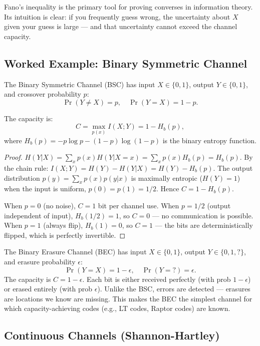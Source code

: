 Fano's inequality is the primary tool for proving converses in information theory. Its intuition is clear: if you frequently guess wrong, the uncertainty about $X$ given your guess is large — and that uncertainty cannot exceed the channel capacity.

\subsection{Worked Example: Binary Symmetric Channel}
\label{sec:information:bsc}

\begin{example}
The Binary Symmetric Channel (BSC) has input $X \in \{0,1\}$, output $Y \in \{0,1\}$, and crossover probability $p$:
\[
\Pr(Y \neq X) = p, \quad \Pr(Y = X) = 1-p.
\]

The capacity is:
\[
C = \max_{p(x)} I(X;Y) = 1 - H_b(p),
\]
where $H_b(p) = -p\log p - (1-p)\log(1-p)$ is the binary entropy function.

\begin{proof}
$H(Y|X) = \sum_x p(x)H(Y|X=x) = \sum_x p(x) H_b(p) = H_b(p)$. By the chain rule: $I(X;Y) = H(Y) - H(Y|X) = H(Y) - H_b(p)$. The output distribution $p(y) = \sum_x p(x)p(y|x)$ is maximally entropic ($H(Y)=1$) when the input is uniform, $p(0)=p(1)=1/2$. Hence $C = 1 - H_b(p)$.

When $p=0$ (no noise), $C=1$ bit per channel use. When $p=1/2$ (output independent of input), $H_b(1/2)=1$, so $C=0$ — no communication is possible. When $p=1$ (always flip), $H_b(1)=0$, so $C=1$ — the bits are deterministically flipped, which is perfectly invertible.
\end{proof}
\end{example}

\begin{example}
The Binary Erasure Channel (BEC) has input $X \in \{0,1\}$, output $Y \in \{0,1,?\}$, and erasure probability $\epsilon$:
\[
\Pr(Y = X) = 1-\epsilon, \quad \Pr(Y = ?) = \epsilon.
\]
The capacity is $C = 1 - \epsilon$. Each bit is either received perfectly (with prob $1-\epsilon$) or erased entirely (with prob $\epsilon$). Unlike the BSC, errors are detected — erasures are locations we know are missing. This makes the BEC the simplest channel for which capacity-achieving codes (e.g., LT codes, Raptor codes) are known.
\end{example}

\subsection{Continuous Channels (Shannon-Hartley)}
\label{sec:information:continuous}

